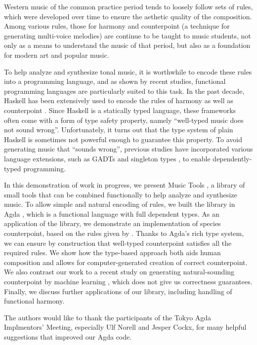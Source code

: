 \documentclass[sigplan,review]{acmart}\settopmatter{printfolios=true,printccs=false,printacmref=false}
\begin{document}
Western music of the common practice period tends to loosely
follow sets of rules, which were developed over time to ensure
the aethetic quality of the composition. 
Among various rules, those for harmony \citep{piston1987harmony}
and counterpoint \citep{fux1965study} (a technique for generating
multi-voice melodies) are continue to be taught to music students,
not only as a means to understand the music of that period, but
also as a foundation for modern art and popular music.

To help analyze and synthesize tonal music, it is worthwhile to
encode these rules into a programming language, and as shown by
recent studies, functional programming languages are particularly
suited to this task.
In the past decade, Haskell has been extensively used to encode
the rules of harmony \citep{fmmh, hihseufha, faamh, hafha, fghm}
as well as counterpoint \citep{szamozvancev2017well}.
Since Haskell is a statically typed language, these frameworks 
often come with a form of type safety property, namely
``well-typed music does not sound wrong''.
Unfortunately, it turns out that the type system of plain Haskell
is sometimes not powerful enough to guarantee this property.
To avoid generating music that ``sounds wrong'', previous studies
have incorporated various language extensions, such as GADTs 
\citep{cheney2002lightweight} and singleton types 
\citep{eisenberg2013dependently}, to enable dependently-typed 
programming.

In this demonstration of work in progress, we present Music Tools
\citep{MusicTools}, a library of small tools that can be combined
functionally to help analyze and synthesize music.
To allow simple and natural encoding of rules, we built the library
in Agda \citep{norellphd}, which is a functional language with full
dependent types.
As an application of the library, we demonstrate an implementation of 
species counterpoint, based on the rules given by \citet{fux1965study}.
Thanks to Agda's rich type system, we can ensure by construction that
well-typed counterpoint satisfies all the required rules.
We show how the type-based approach both aids human composition and
allows for computer-generated creation of correct counterpoint.
We also contrast our work to a recent study on generating
natural-sounding counterpoint by machine learning
\citep{CounterpointByConvolution}, which does not give us correctness
guarantees.
Finally, we discuss further applications of our library, including
handling of functional harmony.


\begin{acks}                            %
 The authors would like to thank the participants of the Tokyo Agda 
 Implmentors' Meeting, especially Ulf Norell and Jesper Cockx,
 for many helpful suggestions that improved our Agda code.
\end{acks}



\end{document}
